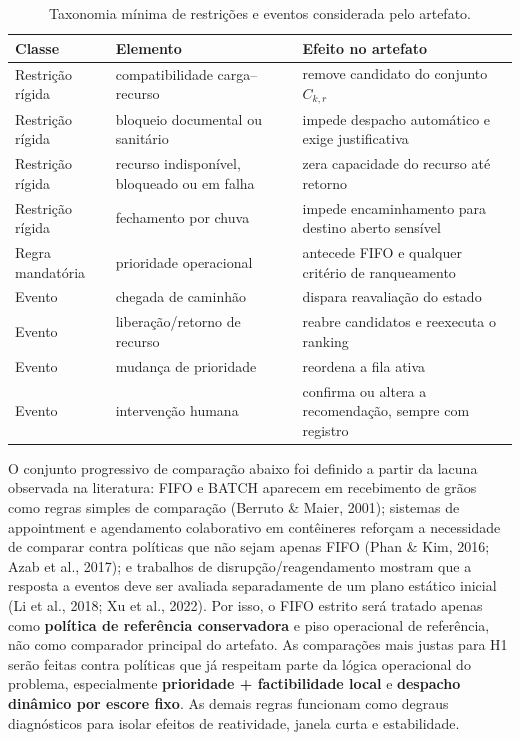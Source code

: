 \documentclass[
  12pt,
  oneside,
  a4paper,
  sumario=tradicional,
  brazil
]{abntex2}
\begin{document}
\begin{table}[H]
\centering
\small
\begin{tabular}{|p{}|p{}|p{}|}
\hline
\textbf{Classe} & \textbf{Elemento} & \textbf{Efeito no artefato} \\
\hline
Restri\c{c}\~ao r\'igida & compatibilidade carga--recurso & remove candidato do conjunto $C_{k,r}$ \\
\hline
Restri\c{c}\~ao r\'igida & bloqueio documental ou sanit\'ario & impede despacho autom\'atico e exige justificativa \\
\hline
Restri\c{c}\~ao r\'igida & recurso indispon\'ivel, bloqueado ou em falha & zera capacidade do recurso at\'e retorno \\
\hline
Restri\c{c}\~ao r\'igida & fechamento por chuva & impede encaminhamento para destino aberto sens\'ivel \\
\hline
Regra mandat\'oria & prioridade operacional & antecede FIFO e qualquer crit\'erio de ranqueamento \\
\hline
Evento & chegada de caminh\~ao & dispara reavalia\c{c}\~ao do estado \\
\hline
Evento & libera\c{c}\~ao/retorno de recurso & reabre candidatos e reexecuta o ranking \\
\hline
Evento & mudan\c{c}a de prioridade & reordena a fila ativa \\
\hline
Evento & interven\c{c}\~ao humana & confirma ou altera a recomenda\c{c}\~ao, sempre com registro \\
\hline
\end{tabular}
\caption{Taxonomia m\'inima de restri\c{c}\~oes e eventos considerada pelo artefato.}
\end{table}

O conjunto progressivo de compara\c{c}\~ao abaixo foi definido a partir da lacuna observada na literatura: FIFO e BATCH aparecem em recebimento de gr\~aos como regras simples de compara\c{c}\~ao (Berruto \& Maier, 2001); sistemas de appointment e agendamento colaborativo em cont\^eineres refor\c{c}am a necessidade de comparar contra pol\'iticas que n\~ao sejam apenas FIFO (Phan \& Kim, 2016; Azab et al., 2017); e trabalhos de disrup\c{c}\~ao/reagendamento mostram que a resposta a eventos deve ser avaliada separadamente de um plano est\'atico inicial (Li et al., 2018; Xu et al., 2022). Por isso, o FIFO estrito ser\'a tratado apenas como \textbf{pol\'itica de refer\^encia conservadora} e piso operacional de refer\^encia, n\~ao como comparador principal do artefato. As compara\c{c}\~oes mais justas para H1 ser\~ao feitas contra pol\'iticas que j\'a respeitam parte da l\'ogica operacional do problema, especialmente \textbf{prioridade + factibilidade local} e \textbf{despacho din\^amico por escore fixo}. As demais regras funcionam como degraus diagn\'osticos para isolar efeitos de reatividade, janela curta e estabilidade.
\end{document}
